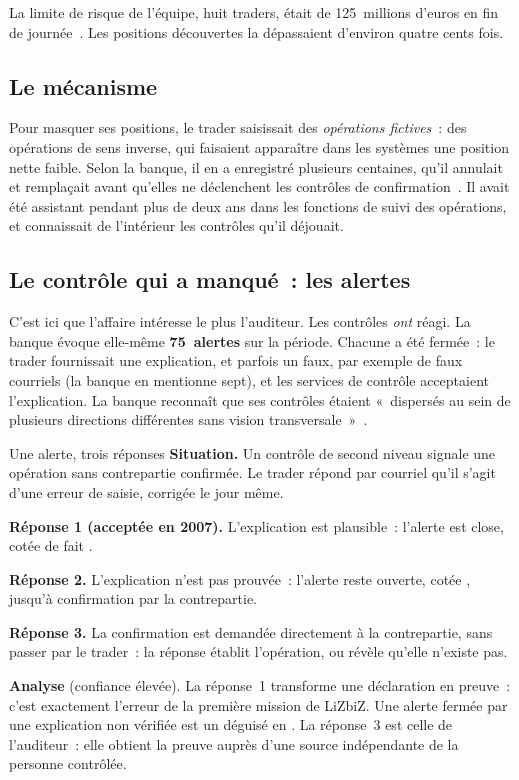 La limite de risque de l'équipe, huit traders, était de 125~millions
d'euros en fin de journée~\cite{sg2016kerviel}. Les positions découvertes
la dépassaient d'environ quatre cents fois.

\subsection{Le mécanisme}

Pour masquer ses positions, le trader saisissait des \emph{opérations
fictives}~: des opérations de sens inverse, qui faisaient apparaître dans
les systèmes une position nette faible. Selon la banque, il en a enregistré
plusieurs centaines, qu'il annulait et remplaçait avant qu'elles ne
déclenchent les contrôles de confirmation~\cite{sg2016kerviel}. Il avait
été assistant pendant plus de deux ans dans les fonctions de suivi des
opérations, et connaissait de l'intérieur les contrôles qu'il déjouait.

\subsection{Le contrôle qui a manqué~: les alertes}

C'est ici que l'affaire intéresse le plus l'auditeur. Les contrôles
\emph{ont} réagi. La banque évoque elle-même \textbf{75~alertes} sur la
période. Chacune a été fermée~: le trader fournissait une explication, et
parfois un faux, par exemple de faux courriels (la banque en mentionne
sept), et les services de contrôle acceptaient l'explication. La banque
reconnaît que ses contrôles étaient «~dispersés au sein de plusieurs
directions différentes sans vision transversale~»~\cite{sg2016kerviel}.

\begin{boxscenario}{Une alerte, trois réponses}
\textbf{Situation.} Un contrôle de second niveau signale une opération sans
contrepartie confirmée. Le trader répond par courriel qu'il s'agit d'une
erreur de saisie, corrigée le jour même.

\medskip
\textbf{Réponse 1 (acceptée en 2007).} L'explication est plausible~:
l'alerte est close, cotée de fait \OUI{}.

\textbf{Réponse 2.} L'explication n'est pas prouvée~: l'alerte reste
ouverte, cotée \NEK{}, jusqu'à confirmation par la contrepartie.

\textbf{Réponse 3.} La confirmation est demandée directement à la
contrepartie, sans passer par le trader~: la réponse établit l'opération,
ou révèle qu'elle n'existe pas.

\medskip
\textbf{Analyse} (confiance élevée). La réponse~1 transforme une
déclaration en preuve~: c'est exactement l'erreur de la première mission
de LiZbiZ. Une alerte fermée par une explication non vérifiée est un
\NEK{} déguisé en \OUI{}. La réponse~3 est celle de l'auditeur~: elle
obtient la preuve auprès d'une source indépendante de la personne
contrôlée.
\end{boxscenario}

